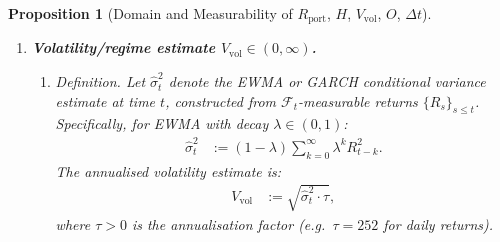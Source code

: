 \documentclass[12pt,openany]{book}
\newcommand{\calF}{\mathcal{F}}
\numberwithin{equation}{chapter}
\theoremstyle{plain}
\newtheorem{proposition}[theorem]{Proposition}
\theoremstyle{definition}
\theoremstyle{remark}
\numberwithin{equation}{chapter}
\theoremstyle{plain}
\begin{document}
\begin{proposition}[Domain and Measurability of $R_{\mathrm{port}}$,
  $H$, $V_{\mathrm{vol}}$, $O$, $\Delta t$]
\begin{enumerate}
\begin{enumerate}
      \item \emph{Domain $H \geq 0$.}
        Since $H = |\Delta_t^{\mathrm{port}}| \cdot S_t$, and
        $|\cdot| \geq 0$ and $S_t > 0$ by
        Assumption~\ref{asm:return-process} (positivity of asset
        prices), we have $H \geq 0$.
        The case $H = 0$ occurs when
        $\Delta_t^{\mathrm{port}} = 0$, i.e.\ the portfolio is
        already delta-neutral.  The case $H = +\infty$ is excluded
        because $N_t$ is finite, $|n_t^{(i)}|$ is bounded by the
        finite capital constraint, and $|\delta_t^{(i)}| \leq 1$
        for standard equity and option deltas.
        Hence $H \in [0, \infty)$.

      \item \emph{Measurability of $H$.}
        Each $n_t^{(i)}$ is determined by the allocation decisions
        up to time $t$, hence $\calF_t$-measurable.
        Each $\delta_t^{(i)}$ is computed from
        $\calF_t$-measurable market data (prices, implied
        volatilities) via the Black--Scholes or agreed pricing
        formula, which is a continuous function of its arguments.
        $S_t$ is $\calF_t$-adapted by
        Assumption~\ref{asm:return-process}.
        Finite sums, absolute values, and products of
        $\calF_t$-measurable quantities are $\calF_t$-measurable.
        Therefore $H$ is $\calF_t$-measurable.
    \end{enumerate}

  \item \textbf{Volatility/regime estimate
    $V_{\mathrm{vol}} \in (0,\infty)$.}

    \begin{enumerate}
      \item \emph{Definition.}
        Let $\hat{\sigma}_t^2$ denote the EWMA or GARCH conditional
        variance estimate at time $t$, constructed from
        $\calF_t$-measurable returns $\{R_s\}_{s \leq t}$.
        Specifically, for EWMA with decay $\lambda \in (0,1)$:
        \begin{align}
          \hat{\sigma}_t^2
            &:= (1 - \lambda)
               \sum_{k=0}^{\infty}
                 \lambda^k R_{t-k}^2.
        \end{align}
        The annualised volatility estimate is:
        \begin{align}
          V_{\mathrm{vol}}
            &:= \sqrt{\hat{\sigma}_t^2 \cdot \tau},
        \end{align}
        where $\tau > 0$ is the annualisation factor
        (e.g.\ $\tau = 252$ for daily returns).


\end{enumerate}
\end{enumerate}
\end{proposition}
\end{document}
